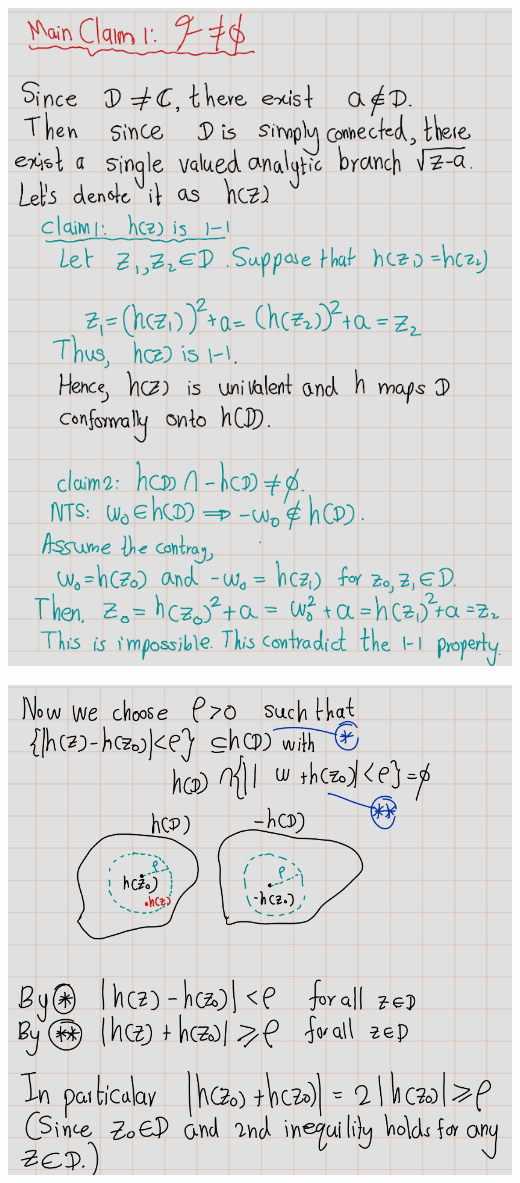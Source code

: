 \documentclass[
]{book}
\theoremstyle{definition}
\theoremstyle{definition}
\theoremstyle{definition}
\theoremstyle{definition}
\theoremstyle{remark}
\begin{document}
\begin{center}\includegraphics[width=8.96in]{figures/Riemann_Mapping_Therom/fig5} \end{center}

\begin{center}\includegraphics[width=11.62in]{figures/Riemann_Mapping_Therom/fig6} \end{center}
\end{document}
